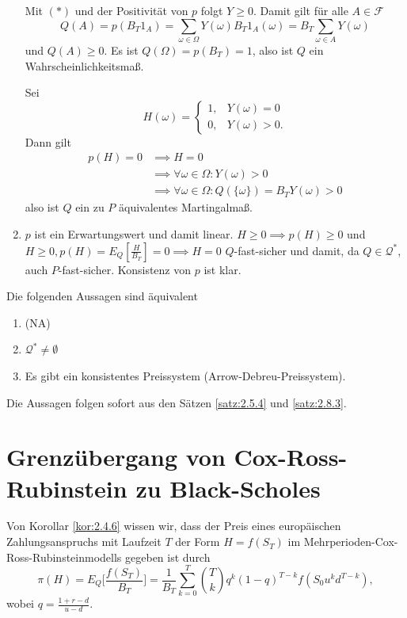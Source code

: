 \documentclass[a4paper,twoside,DIV15,BCOR12mm]{scrbook}
\newcommand{\cF}{\mathcal F}
\newcommand{\cQ}{\mathcal Q}
\begin{document}
\begin{beweis}
\begin{enumerate}
Mit $(*)$  und der Positivität von $p$ folgt $Y\ge 0$. Damit gilt für alle $A\in \cF$
\[
Q(A) = p(B_T1_A)
= \sum_{\omega\in\Omega} Y(\omega) B_T 1_A(\omega)
=  B_T \sum_{\omega\in A} Y(\omega)
\]
und $Q(A) \ge 0$. Es ist $Q(\Omega)=p(B_T) = 1$, also ist $Q$ ein Wahrscheinlichkeitsmaß.

Sei 
\[
H(\omega)=
\begin{cases}
1, & Y(\omega) =0\\
0, & Y(\omega) >0.
\end{cases}\]
Dann gilt
\begin{align*}
p(H) = 0 &\implies  H= 0\\
&\implies \forall \omega \in \Omega: Y(\omega) >0 \\
&\implies \forall \omega \in \Omega: Q(\{\omega\}) = B_TY(\omega) >0 
\end{align*}
also ist $Q$ ein zu $P$ äquivalentes Martingalmaß.
\item $p$ ist ein Erwartungswert und damit linear. $H\ge 0 \implies p(H)\ge 0$ und $H\ge 0, p(H) = E_Q[\frac{H}{B_T}] = 0 \implies H= 0$ $Q$-fast-sicher und damit, da $Q\in\cQ^*$, auch $P$-fast-sicher. Konsistenz von $p$ ist klar.
\end{enumerate}
\end{beweis}

\begin{satz}
Die folgenden Aussagen sind äquivalent
\begin{enumerate}
\item (NA)
\item $\cQ^*\ne \emptyset$
\item Es gibt ein konsistentes Preissystem (Arrow-Debreu-Preissystem).
\end{enumerate}
\end{satz}

\begin{beweis}
Die Aussagen folgen sofort aus den Sätzen \ref{satz:2.5.4} und \ref{satz:2.8.3}.
\end{beweis}

\section{Grenzübergang von Cox-Ross-Rubinstein zu Black-Scholes}

Von Korollar \ref{kor:2.4.6} wissen wir, dass der Preis eines europäischen Zahlungsanspruchs mit Laufzeit $T$ der Form $H=f(S_T)$ im Mehrperioden-Cox-Ross-Rubinsteinmodells gegeben ist durch
\[
\pi(H) = E_Q\bigg[\frac{f(S_T)}{B_T}\bigg] = \frac1{B_T} \sum_{k=0}^T \binom T k q^k(1-q)^{T-k} f(S_0 u^k d^{T-k}),
\]
wobei $q=\frac{1+r-d}{u-d}$.
\end{document}
